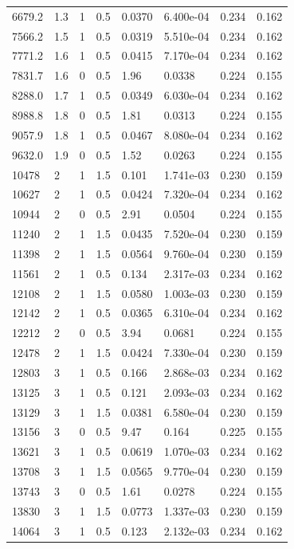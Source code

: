 \documentclass[preview]{standalone}
\begin{document}
{{\begin{tabular}{L{1.2cm}C{1.2cm} C{0.3cm}C{0.5cm} C{1.4cm}C{1.4cm} C{1.4cm}C{1.4cm}}
  6679.2  &   1.3  & 1     & 0.5 &  0.0370  & 6.400e-04  & 0.234 &  0.162   \\ 
  7566.2  &   1.5  & 1     & 0.5 &  0.0319  & 5.510e-04  & 0.234 &  0.162   \\ 
  7771.2  &   1.6  & 1     & 0.5 &  0.0415  & 7.170e-04  & 0.234 &  0.162   \\ 
  7831.7  &   1.6  & 0     & 0.5 &  1.96  & 0.0338  & 0.224 &  0.155   \\ 
  8288.0  &   1.7  & 1     & 0.5 &  0.0349  & 6.030e-04  & 0.234 &  0.162   \\ 
  8988.8  &   1.8  & 0     & 0.5 &  1.81  & 0.0313  & 0.224 &  0.155   \\ 
  9057.9  &   1.8  & 1     & 0.5 &  0.0467  & 8.080e-04  & 0.234 &  0.162   \\ 
  9632.0  &   1.9  & 0     & 0.5 &  1.52  & 0.0263  & 0.224 &  0.155   \\ 
  10478  &     2  & 1     & 1.5 &  0.101  & 1.741e-03  & 0.230 &  0.159   \\ 
  10627  &     2  & 1     & 0.5 &  0.0424  & 7.320e-04  & 0.234 &  0.162   \\ 
  10944  &     2  & 0     & 0.5 &  2.91  & 0.0504  & 0.224 &  0.155   \\ 
  11240  &     2  & 1     & 1.5 &  0.0435  & 7.520e-04  & 0.230 &  0.159   \\ 
  11398  &     2  & 1     & 1.5 &  0.0564  & 9.760e-04  & 0.230 &  0.159   \\ 
  11561  &     2  & 1     & 0.5 &  0.134  & 2.317e-03  & 0.234 &  0.162   \\ 
  12108  &     2  & 1     & 1.5 &  0.0580  & 1.003e-03  & 0.230 &  0.159   \\ 
  12142  &     2  & 1     & 0.5 &  0.0365  & 6.310e-04  & 0.234 &  0.162   \\ 
  12212  &     2  & 0     & 0.5 &  3.94  & 0.0681  & 0.224 &  0.155   \\ 
  12478  &     2  & 1     & 1.5 &  0.0424  & 7.330e-04  & 0.230 &  0.159   \\ 
  12803  &     3  & 1     & 0.5 &  0.166  & 2.868e-03  & 0.234 &  0.162   \\ 
  13125  &     3  & 1     & 0.5 &  0.121  & 2.093e-03  & 0.234 &  0.162   \\ 
  13129  &     3  & 1     & 1.5 &  0.0381  & 6.580e-04  & 0.230 &  0.159   \\ 
  13156  &     3  & 0     & 0.5 &  9.47  & 0.164  & 0.225 &  0.155   \\ 
  13621  &     3  & 1     & 0.5 &  0.0619  & 1.070e-03  & 0.234 &  0.162   \\ 
  13708  &     3  & 1     & 1.5 &  0.0565  & 9.770e-04  & 0.230 &  0.159   \\ 
  13743  &     3  & 0     & 0.5 &  1.61  & 0.0278  & 0.224 &  0.155   \\ 
  13830  &     3  & 1     & 1.5 &  0.0773  & 1.337e-03  & 0.230 &  0.159   \\ 
  14064  &     3  & 1     & 0.5 &  0.123  & 2.132e-03  & 0.234 &  0.162   \\ 
\hline 
\end{tabular} 

}}
\end{document}
